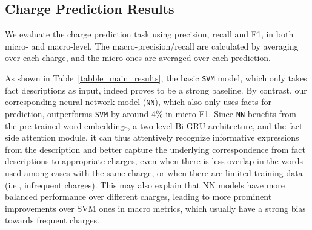 

\subsection{Charge Prediction Results}
\label{sec_main_results}
We evaluate the charge prediction task using precision, recall and F1, in both micro- and macro-level.
The macro-precision/recall are calculated by averaging over %
each charge, and the micro ones are averaged  over each prediction. %



As shown in Table~\ref{tabble_main_results}, %
the basic \texttt{SVM} model,
which only takes fact descriptions as input, indeed proves to be a strong baseline.
By contrast, our corresponding neural network model (\texttt{NN}), which also only uses facts for prediction, outperforms \texttt{SVM} 
by around 4\% in micro-F1.
Since \texttt{NN} benefits from the pre-trained word embeddings,
a two-level Bi-GRU architecture, and the fact-side attention module,
it can thus attentively recognize informative expressions from the description and 
better capture the underlying correspondence from fact descriptions to appropriate charges,
even when there is less overlap in the words used among cases with the same charge,
or when there are limited training data (i.e., infrequent charges). This may also explain that NN models 
have more balanced performance over different charges, leading to more prominent improvements over 
SVM ones in macro metrics, which usually have a strong bias towards frequent charges.
%


